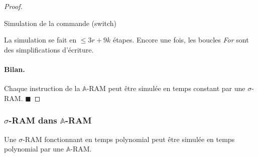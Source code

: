 \documentclass{report}
\newcommand{\bbA}{\mathbb{A}}
\begin{document}
\begin{proof}
\begin{algorithm}[H]
						\caption{Simulation de la commande (switch)}
					\end{algorithm}
					
					\espace 
					
					La simulation se fait en $\leq 3r + 9k$ étapes. Encore une fois, les boucles \emph{For} sont des simplifications d'écriture. 
				
					\paragraph{Bilan.}
					Chaque instruction de la $\bbA$-RAM peut être simulée en temps constant par une $\sigma$-RAM. $\blacksquare$
				\end{proof}
	
	
				\subsubsection{$\sigma$-RAM dans $\bbA$-RAM}
				\label{subsubsec:sim_sigma_RAM_A_RAM}
				
				
				\begin{lemma}
					\label{lem:sim_sigma_RAM_A_RAM}
					Une $\sigma$-RAM fonctionnant en temps polynomial peut être simulée en temps polynomial par une $\bbA$-RAM.
				\end{lemma}
	
\end{document}
